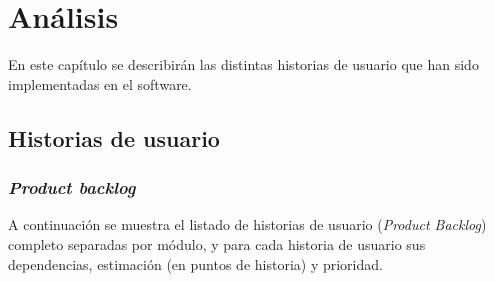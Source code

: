 \chapter{Análisis}

En este capítulo se describirán las distintas historias de usuario que han sido implementadas en el software.

\section{Historias de usuario}

\subsection{\textit{Product backlog}}

A continuación se muestra el listado de historias de usuario (\textit{Product Backlog}) completo separadas por módulo, y para cada historia de usuario sus dependencias, estimación (en puntos de historia) y prioridad.

